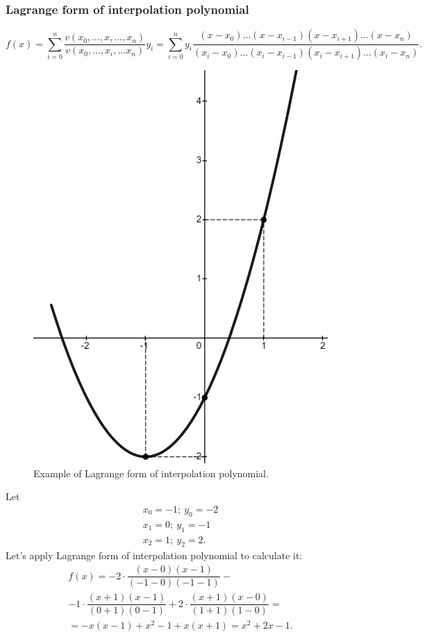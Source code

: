 \subsubsection*{Lagrange form of interpolation polynomial}
\[
    f(x) = \sum\limits_{i=0}^{n} \dfrac{v(x_0, \ldots, x, \ldots, x_n)}{v(x_0, \ldots, x_i, \ldots x_n)} y_i = \sum\limits_{i=0}^{n}y_i \dfrac{(x-x_0)\ldots(x-x_{i-1})(x-x_{i+1})\ldots (x-x_n)}{(x_i - x_0)\ldots (x_i - x_{i-1})(x_i - x_{i+1})\ldots (x_i - x_n)}.  
\]
\begin{figure}
    \includegraphics[height=0.4\columnwidth, width=0.37\columnwidth]{./lectures/images/lecture3_lagrange_example.png}
    \caption*{\small{Example of Lagrange form of interpolation polynomial.}}
\end{figure}
\vspace*{1cm}

\Ex Let 
\[
    \begin{array}{c}
        x_0 = -1; \ y_0 = -2 \\
        x_1 = 0; \ y_1 = -1\\
        x_2 = 1; \ y_2 = 2.
    \end{array} 
\]
Let's apply Lagrange form of interpolation polynomial to calculate it:
\[
    \begin{array}{c}
        f(x) = -2 \cdot \dfrac{(x-0)(x-1)}{(-1 - 0)(-1 -1)} - \\[0.4cm] - 1\cdot \dfrac{(x+1)(x-1)}{(0+1)(0-1)} + 2\cdot \dfrac{(x+1)(x-0)}{(1+1)(1-0)}= \\
         = -x(x-1) + x^2 - 1 + x(x+1) = x^2 + 2x - 1.
    \end{array}  
\]
\vspace*{0.25cm}

